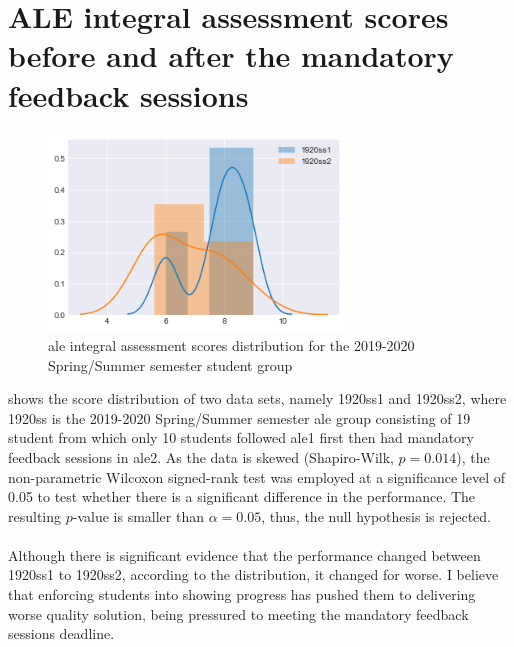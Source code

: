\chapter{ALE integral assessment scores before and after the mandatory feedback sessions}\label{appendices:scores}

\begin{figure}[h]
    \centering
    \includegraphics[width=0.7\textwidth]{figures/distribution1920ss.png}
    \caption{\acrshort{ale} integral assessment scores distribution for the 2019-2020 Spring/Summer semester student group}
    \label{fig:distribution1920ss}
\end{figure}
\noindent {} shows the score distribution of two data sets, namely 1920ss1 and 1920ss2, where 1920ss is the 2019-2020 Spring/Summer semester \acrshort{ale} group consisting of 19 student from which only 10 students followed \acrshort{ale}1 first then had mandatory feedback sessions in \acrshort{ale}2. 
As the data is skewed (Shapiro-Wilk, $p=0.014$), the non-parametric Wilcoxon signed-rank test was employed at a significance level of 0.05 to test whether there is a significant difference in the performance.
The resulting $p$-value is smaller than $\alpha=0.05$, thus, the null hypothesis is rejected.\\\\
Although there is significant evidence that the performance changed between 1920ss1 to 1920ss2, according to the distribution, it changed for worse. I believe that enforcing students into showing progress has pushed them to delivering worse quality solution, being pressured to meeting the mandatory feedback sessions deadline.  